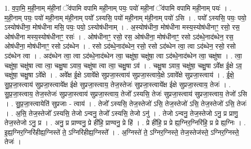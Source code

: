 \documentclass[17pt]{extarticle}
\begin{document}
1. व॒पा॒मि॒ म॒ही॒नाम् म॑ही॒नां ॅव॑पामि वपामि मही॒नाम् पयः॒ पयो॑ मही॒नां ॅव॑पामि वपामि मही॒नाम् पयः॑ । . म॒ही॒नाम् पयः॒ पयो॑ मही॒नाम् म॑ही॒नाम् पयो᳚ ऽस्यसि॒ पयो॑ मही॒नाम् म॑ही॒नाम् पयो॑ ऽसि । . पयो᳚ ऽस्यसि॒ पयः॒ पयो॒ ऽस्योष॑धीना॒ मोष॑धीना मसि॒ पयः॒ पयो॒ ऽस्योष॑धीनाम् । . अ॒स्योष॑धीना॒ मोष॑धीना मस्य॒स्योष॑धीनाꣳ॒॒ रसो॒ रस॒ ओष॑धीना मस्य॒स्योष॑धीनाꣳ॒॒ रसः॑ । . ओष॑धीनाꣳ॒॒ रसो॒ रस॒ ओष॑धीना॒ मोष॑धीनाꣳ॒॒ रसो ऽद॑ब्धे॒नाद॑ब्धेन॒ रस॒ ओष॑धीना॒ मोष॑धीनाꣳ॒॒ रसो ऽद॑ब्धेन । . रसो ऽद॑ब्धे॒नाद॑ब्धेन॒ रसो॒ रसो ऽद॑ब्धेन त्वा॒ त्वा ऽद॑ब्धेन॒ रसो॒ रसो ऽद॑ब्धेन त्वा । . अद॑ब्धेन त्वा॒ त्वा ऽद॑ब्धे॒नाद॑ब्धेन त्वा॒ चक्षु॑षा॒ चक्षु॑षा॒ त्वा ऽद॑ब्धे॒नाद॑ब्धेन त्वा॒ चक्षु॑षा । . त्वा॒ चक्षु॑षा॒ चक्षु॑षा त्वा त्वा॒ चक्षु॒षा ऽवाव॒ चक्षु॑षा त्वा त्वा॒ चक्षु॒षा ऽव॑ । . चक्षु॒षा ऽवाव॒ चक्षु॑षा॒ चक्षु॒षा ऽवे᳚क्ष ई॒क्षे ऽव॒ चक्षु॑षा॒ चक्षु॒षा ऽवे᳚क्षे । . अवे᳚क्ष ई॒क्षे ऽवावे᳚क्षे सुप्रजा॒स्त्वाय॑ सुप्रजा॒स्त्वाये॒क्षे ऽवावे᳚क्षे सुप्रजा॒स्त्वाय॑ । . ई॒क्षे॒ सु॒प्र॒जा॒स्त्वाय॑ सुप्रजा॒स्त्वाये᳚क्ष ईक्षे सुप्रजा॒स्त्वाय॒ तेज॒स्तेजः॑ सुप्रजा॒स्त्वाये᳚क्ष ईक्षे सुप्रजा॒स्त्वाय॒ तेजः॑ । . सु॒प्र॒जा॒स्त्वाय॒ तेज॒स्तेजः॑ सुप्रजा॒स्त्वाय॑ सुप्रजा॒स्त्वाय॒ तेजो᳚ ऽस्यसि॒ तेजः॑ सुप्रजा॒स्त्वाय॑ सुप्रजा॒स्त्वाय॒ तेजो॑ ऽसि । . सु॒प्र॒जा॒स्त्वायेति॑ सुप्रजाः - त्वाय॑ । . तेजो᳚ ऽस्यसि॒ तेज॒स्तेजो॑ ऽसि॒ तेज॒स्तेजो॑ ऽसि॒ तेज॒स्तेजो॑ ऽसि॒ तेजः॑ । . अ॒सि॒ तेज॒स्तेजो᳚ ऽस्यसि॒ तेजो ऽन्वनु॒ तेजो᳚ ऽस्यसि॒ तेजो ऽनु॑ । . तेजो ऽन्वनु॒ तेज॒स्तेजो ऽनु॒ प्र प्राणु॒ तेज॒स्तेजो ऽनु॒ प्र । . अनु॒ प्र प्राण्वनु॒ प्रे ही॑हि॒ प्राण्वनु॒ प्रे हि॑ । . प्रे ही॑हि॒ प्र प्रे ह्य॒ग्निर॒ग्निरि॑हि॒ प्र प्रे ह्य॒ग्निः । . इ॒ह्य॒ग्निर॒ग्निरि॑हीह्य॒ग्निस्ते॑ ते॒ ऽग्निरि॑हीह्य॒ग्निस्ते᳚ । . अ॒ग्निस्ते॑ ते॒ ऽग्निर॒ग्निस्ते॒ तेज॒स्तेज॑स्ते॒ ऽग्निर॒ग्निस्ते॒ तेजः॑ । \newline
\end{document}
